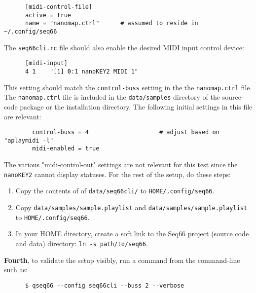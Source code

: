    \begin{verbatim}
      [midi-control-file]
      active = true
      name = "nanomap.ctrl"      # assumed to reside in ~/.config/seq66
   \end{verbatim}

   The \texttt{seq66cli.rc} file should also enable the desired MIDI input
   control device:

   \begin{verbatim}
      [midi-input]
      4 1    "[1] 0:1 nanoKEY2 MIDI 1"
   \end{verbatim}

   This setting should match the \texttt{control-buss} setting in the
   the \texttt{nanomap.ctrl} file.  The \texttt{nanomap.ctrl} file is included
   in the \texttt{data/samples} directory of the source-code package or the
   installation directory.  The following initial settings in this file are
   relevant:

   \begin{verbatim}
		control-buss = 4					# adjust based on "aplaymidi -l"
		midi-enabled = true
   \end{verbatim}

   The various "midi-control-out" settings are not relevant for this test since
   the \texttt{nanoKEY2} cannot display statuses.
   For the rest of the setup, do these steps:

   \begin{enumerate}
      \item Copy the contents of of \texttt{data/seq66cli/} to
         \texttt{HOME/.config/seq66}.
      \item Copy \texttt{data/samples/sample.playlist} and
         \texttt{data/samples/sample.playlist} to
         \texttt{HOME/.config/seq66}.
      \item In your HOME directory, create a soft link to the Seq66 project
         (source code and data) directory: \texttt{ln -s path/to/seq66}.
   \end{enumerate}

   \textbf{Fourth}, to validate the setup visibly, run a command from the
   command-line such as:

   \begin{verbatim}
      $ qseq66 --config seq66cli --buss 2 --verbose
   \end{verbatim}


